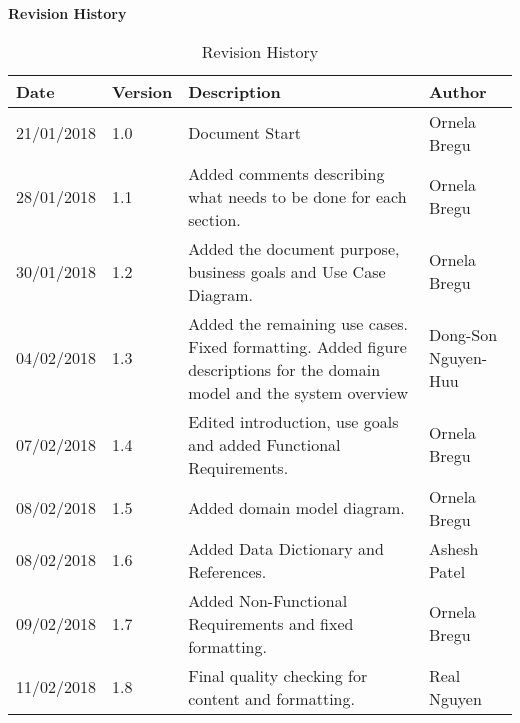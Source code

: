 \documentclass[12pt]{article}
\begin{document}
\Large{\bf Revision History}
\vspace*{0.2in}
\begin{table}[ht]


\begin{center}
\begin{tabular}{| m{2cm} | m{2cm}| m{8cm} | m{3cm}|}
\hline
\textbf{Date} & \textbf{Version} & \textbf{Description} & \textbf{Author} \\

\hline 21/01/2018 & 1.0 & Document Start & Ornela Bregu\\ \hline 28/01/2018 & 1.1 & Added comments describing what needs to be done for each section. & Ornela Bregu  \\

\hline 30/01/2018 & 1.2 & Added the document purpose, business goals and Use Case Diagram. & Ornela Bregu  \\ \hline 04/02/2018 & 1.3 & Added the remaining use cases. Fixed formatting. Added figure descriptions for the domain model and the system overview & Dong-Son Nguyen-Huu \\ 

\hline 07/02/2018 & 1.4 & Edited introduction, use goals and added Functional Requirements. & Ornela Bregu \\ 

\hline 08/02/2018 & 1.5 & Added domain model diagram. & Ornela Bregu  \\ 

\hline 08/02/2018 & 1.6 & Added Data Dictionary and References. & Ashesh Patel \\

\hline 09/02/2018 & 1.7 & Added Non-Functional Requirements and fixed formatting. & Ornela Bregu  \\ 

\hline 11/02/2018 & 1.8 & Final quality checking for content and formatting. & Real Nguyen \\

\hline
\end{tabular}
\caption{Revision History}
\end{center}
\end{table}

\clearpage
\listoffigures
\listoftables
\clearpage

\tableofcontents
\clearpage
\end{document}
